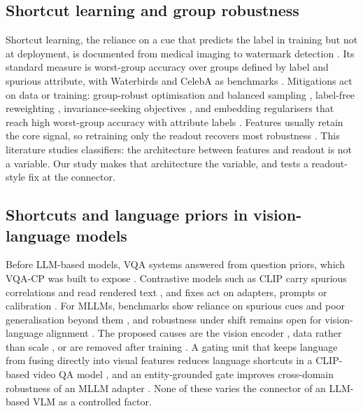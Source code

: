 \subsection{Shortcut learning and group robustness}

Shortcut learning, the reliance on a cue that predicts the label in training but not at deployment, is documented
from medical imaging to watermark detection \citep{geirhos2020shortcut,degrave2021covid,lapuschkin2019clever}. Its
standard measure is worst-group accuracy over groups defined by label and spurious attribute, with Waterbirds and
CelebA as benchmarks \citep{sagawa2020groupdro,liu2015celeba}. Mitigations act on data or training: group-robust
optimisation and balanced sampling \citep{sagawa2020groupdro,idrissi2022balancing}, label-free reweighting
\citep{nam2020lff,liu2021jtt,qiu2023afr}, invariance-seeking objectives \citep{huang2024losingtickets,mitchell2026wule}, and
embedding regularisers that reach high worst-group accuracy with attribute labels \citep{park2026scer}. Features usually retain the core signal, so retraining only the readout recovers most robustness
\citep{izmailov2022feature,kirichenko2023dfr}. This literature studies classifiers: the architecture between features and
readout is not a variable. Our study makes that architecture the variable, and tests a readout-style fix at the
connector.

\subsection{Shortcuts and language priors in vision-language models}

Before LLM-based models, VQA systems answered from question priors, which VQA-CP was built to expose
\citep{agrawal2018vqacp,goyal2019vqav2}. Contrastive models such as CLIP carry spurious correlations and read rendered
text \citep{radford2021clip,materzynska2022disentangling}, and fixes act on adapters, prompts or calibration
\citep{zhang2022adapters,chuang2023biasedprompts,you2024calibrating}. For MLLMs, benchmarks show reliance on spurious cues
and poor generalisation beyond them \citep{hosseini2025spurlens,yang2025spuriverse,ye2026mmspubench,zhang2024oodmllm},
and robustness under shift remains open for vision-language alignment \citep{zhu2024vlalignood}. The proposed causes are the
vision encoder \citep{tong2024eyes}, data rather than scale \citep{sarridis2026scaling}, or are removed after training
\citep{sarker2026purge}. A gating unit that keeps language from fusing directly into visual features reduces language
shortcuts in a CLIP-based video QA model \citep{zou2024videodistill}, and an entity-grounded gate improves cross-domain
robustness of an MLLM adapter \citep{ahn2026evident}. None of these varies the connector of an LLM-based VLM as a
controlled factor.

